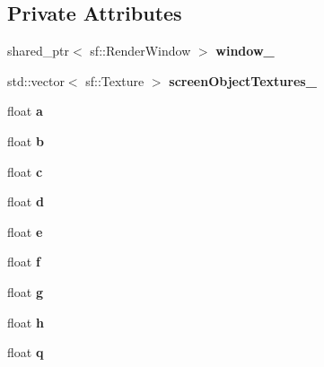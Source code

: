 \subsection*{Private Attributes}
\begin{DoxyCompactItemize}
\item 
\mbox{\label{class_splash_screen_a6e5534a8525379af86dff12d7a973a35}} 
shared\+\_\+ptr$<$ sf\+::\+Render\+Window $>$ {\bfseries window\+\_\+}
\item 
\mbox{\label{class_splash_screen_ab07847d1ec31f99737ad2a3131c4d985}} 
std\+::vector$<$ sf\+::\+Texture $>$ {\bfseries screen\+Object\+Textures\+\_\+}
\item 
\mbox{\label{class_splash_screen_aafcefbb104c701194a6ae390d3c1015f}} 
float {\bfseries a}
\item 
\mbox{\label{class_splash_screen_a9e97934c6104c7df599089ca4fd64f11}} 
float {\bfseries b}
\item 
\mbox{\label{class_splash_screen_a74b76a6b24b334f0244440305193e457}} 
float {\bfseries c}
\item 
\mbox{\label{class_splash_screen_a474a4444e35bda0797985eef2f642c3c}} 
float {\bfseries d}
\item 
\mbox{\label{class_splash_screen_a7fa565ee936d4a022b68b4b92fdfa66c}} 
float {\bfseries e}
\item 
\mbox{\label{class_splash_screen_a114b8336b153cfbd25053ee6857432f7}} 
float {\bfseries f}
\item 
\mbox{\label{class_splash_screen_ad2532945a72a48c68f6f6f8da8d27707}} 
float {\bfseries g}
\item 
\mbox{\label{class_splash_screen_a59151d152682fd4f8e7f69da9cfd9e43}} 
float {\bfseries h}
\item 
\mbox{\label{class_splash_screen_aff4c9ec4c870cd11f9510da0593b895f}} 
float {\bfseries q}

\end{DoxyCompactItemize}
